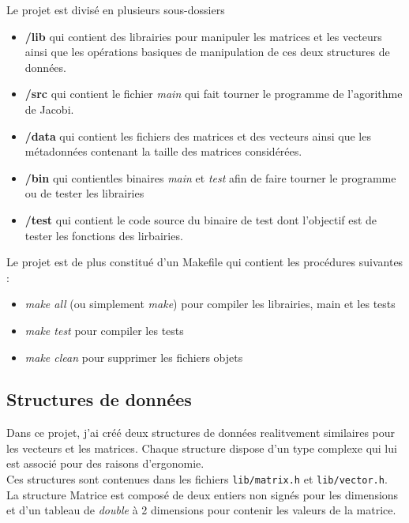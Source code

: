 \documentclass[11pt, a4paper]{article}
\begin{document}
Le projet est divisé en plusieurs sous-dossiers
\begin{itemize}
    \item \textbf{/lib} qui contient des librairies pour manipuler les matrices et les vecteurs ainsi que les opérations basiques de manipulation de ces deux structures de données.
    \item \textbf{/src} qui contient le fichier \textit{main} qui fait tourner le programme de l'agorithme de Jacobi.
    \item \textbf{/data} qui contient les fichiers des matrices et des vecteurs ainsi que les métadonnées contenant la taille des matrices considérées.
    \item \textbf{/bin} qui contientles binaires \textit{main} et \textit{test} afin de faire tourner le programme ou de tester les librairies
    \item \textbf{/test} qui contient le code source du binaire de test dont l'objectif est de tester les fonctions des lirbairies.
\end{itemize}
Le projet est de plus constitué d'un Makefile qui contient les procédures suivantes :
\begin{itemize}
    \item \textit{make all} (ou simplement \textit{make}) pour compiler les librairies, main et les tests 
    \item \textit{make test} pour compiler les tests 
    \item \textit{make clean} pour supprimer les fichiers objets
\end{itemize}

\subsection{Structures de données}

Dans ce projet, j'ai créé deux structures de données realitvement similaires pour les vecteurs et les matrices. Chaque structure dispose d'un type complexe qui lui est associé pour des raisons d'ergonomie.\\

Ces structures sont contenues dans les fichiers \texttt{lib/matrix.h} et \texttt{lib/vector.h}.\\

La structure Matrice est composé de deux entiers non signés pour les dimensions et d'un tableau de \textit{double} à 2 dimensions pour contenir les valeurs de la matrice.\\
\end{document}
